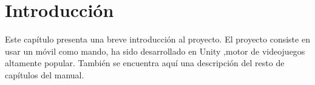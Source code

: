 %
%
%
%
%
%
%
%
%
%

\chapter{Introducci\'on}

\begin{FraseCelebre}
\begin{Frase}
\end{Frase}
\begin{Fuente}
\end{Fuente}
\end{FraseCelebre}

\begin{resumen}
  Este cap\'itulo presenta una breve introducci\'on al proyecto.  El proyecto consiste en usar un m\'ovil como mando,
 ha sido desarrollado en Unity ,motor de videojuegos altamente popular. Tambi\'en se
  encuentra aqu\'i una descripci\'on del resto de cap\'itulos del manual.
\end{resumen}



